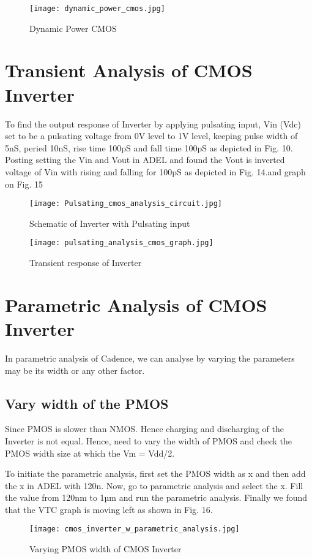 \documentclass[conference]{IEEEtran}
\begin{document}
\begin{figure}
    \centering
    \texttt{[image: dynamic\_power\_cmos.jpg]}
    \caption{Dynamic Power CMOS}
    \label{fig:enter-label}
\end{figure}



\section{Transient Analysis of CMOS Inverter}
To find the output response of Inverter by applying pulsating input, Vin (Vdc) set to be a pulsating voltage from 0V level to 1V level, keeping pulse width of 5nS, peried 10nS, rise time 100pS and fall time 100pS as depicted in Fig. 10. Posting setting the Vin and Vout in ADEL and found the Vout is inverted voltage of Vin with rising and falling for 100pS as depicted in Fig. 14.and graph on Fig. 15
\begin{figure}
    \centering
    \texttt{[image: Pulsating\_cmos\_analysis\_circuit.jpg]}
    \caption{Schematic of Inverter with Pulsating input}
    \label{fig:enter-label}
\end{figure}


\begin{figure}
    \centering
    \texttt{[image: pulsating\_analysis\_cmos\_graph.jpg]}
    \caption{Transient response of Inverter}
    \label{fig:enter-label}
\end{figure}

\section{Parametric Analysis of CMOS Inverter}
In parametric analysis of Cadence, we can analyse by varying the parameters may be its width or any other factor.
\subsection{Vary width of the PMOS} 
Since PMOS is slower than NMOS. Hence charging and discharging of the Inverter is not equal. Hence, need to vary the width of PMOS and check the PMOS width size at which the Vm = Vdd/2. \par
To initiate the parametric analysis, first set the PMOS width as x and then add the x in ADEL with 120n. Now, go to parametric analysis and select the x. Fill the value from 120nm to 1µm and run the parametric analysis. Finally we found that the VTC graph is moving left as shown in Fig. 16.
\begin{figure}
    \centering
    \texttt{[image: cmos\_inverter\_w\_parametric\_analysis.jpg]}
    \caption{Varying PMOS width of CMOS Inverter}
    \label{fig:enter-label}
\end{figure}
\end{document}
